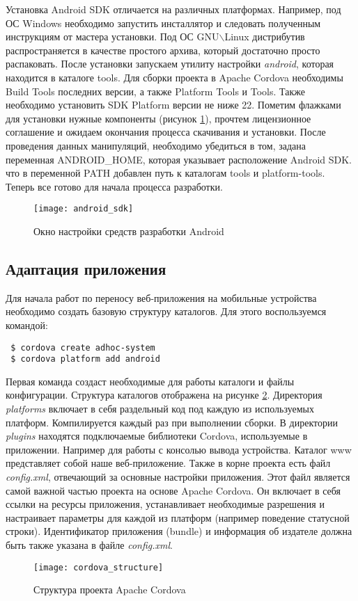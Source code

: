 Установка Android SDK отличается на различных платформах. Например, под ОС Windows необходимо запустить инсталлятор и следовать полученным инструкциям от мастера установки. Под ОС GNU$\backslash$Linux дистрибутив распространяется в качестве простого архива, который достаточно просто распаковать. После установки запускаем утилиту настройки \textit{android}, которая находится в каталоге tools. Для сборки проекта в Apache Cordova необходимы Build Tools последних версии, а также Platform Tools и Tools. Также необходимо установить SDK Platform версии не ниже 22. Пометим флажками для установки нужные компоненты (рисунок \ref{android_sdk}), прочтем лицензионное соглашение и ожидаем окончания процесса скачивания и установки. После проведения данных манипуляций, необходимо убедиться в том, задана переменная ANDROID\_HOME, которая указывает расположение Android SDK. что в переменной PATH добавлен путь к каталогам tools и platform-tools. Теперь все готово для начала процесса разработки.
\begin{figure}[ht]
\center\texttt{[image: android\_sdk]}
\caption{Окно настройки средств разработки Android}\label{android_sdk}
\end{figure}

\subsection{Адаптация приложения}
Для начала работ по переносу веб-приложения на мобильные устройства необходимо создать базовую структуру каталогов. Для этого воспользуемся командой:
\begin{lstlisting}
 $ cordova create adhoc-system
 $ cordova platform add android
\end{lstlisting}

Первая команда создаст необходимые для работы каталоги и файлы конфигурации. Структура каталогов отображена на рисунке \ref{cordova_structure}. Директория \textit{platforms} включает в себя раздельный код под каждую из используемых платформ. Компилируется каждый раз при выполнении сборки. В директории \textit{plugins} находятся подключаемые библиотеки Cordova, используемые в приложении. Например для работы с консолью вывода устройства. Каталог www представляет собой наше веб-приложение. Также в корне проекта есть файл \textit{config.xml}, отвечающий за основные настройки приложения. Этот файл является самой важной частью проекта на основе Apache Cordova. Он включает в себя ссылки на ресурсы приложения, устанавливает необходимые разрешения и настраивает параметры для каждой из платформ (например поведение статусной строки). Идентификатор приложения (bundle) и информация об издателе должна быть также указана в файле \textit{config.xml}.
\begin{figure}[ht]
\center\texttt{[image: cordova\_structure]}
\caption{Структура проекта Apache Cordova}\label{cordova_structure}
\end{figure}

